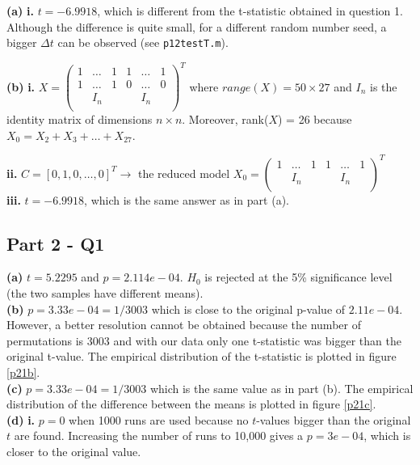 \documentclass[11pt,a4paper,oneside]{report}
\begin{document}
\noindent \large{\textbf{(a)}} \textbf{i. } $t = -6.9918$, which is different from the t-statistic obtained in question 1. Although the difference is quite small, for a different random number seed, a bigger $\Delta t$ can be observed (see \texttt{p12testT.m}). 

\noindent \large{\textbf{(b)}} \textbf{i. } $X = \begin{pmatrix}
1 & \dots & 1 & 1 & \dots & 1\\
1 & \dots & 1 & 0 & \dots & 0\\
& I_n & & & I_n &\\
\end{pmatrix}^T$  where $range(X) = 50 \times 27$ and $I_n$ is the identity matrix of dimensions $n \times n$. Moreover, rank($X$) = 26 because $X_0 = X_2 + X_3 + \dots + X_{27}$.

\textbf{ii. } $C = [0, 1, 0, \dots, 0]^T \to$ the reduced model $X_0 = \begin{pmatrix}
1 & \dots & 1 & 1 & \dots & 1\\
& I_n & & & I_n &\\
\end{pmatrix}^T$\\

\textbf{iii. }  $t = -6.9918$, which is the same answer as in part (a).\\

\subsection*{Part 2 - Q1}

\noindent \large{\textbf{(a)}} $t = 5.2295$ and $p=2.114e-04$. $H_0$ is rejected at the 5\% significance level (the two samples have different means).\\

\noindent \large{\textbf{(b)}} $p=3.33e-04 = 1/3003$ which is close to the original p-value of $2.11e-04$. However, a better resolution cannot be obtained because the number of permutations is 3003 and with our data only one t-statistic was bigger than the original t-value. The empirical distribution of the t-statistic is plotted in figure \ref{p21b}.\\

\noindent \large{\textbf{(c)}} $p=3.33e-04 = 1/3003$ which is the same value as in part (b). The empirical distribution of the difference between the means is plotted in figure \ref{p21c}.\\

\noindent \large{\textbf{(d)}} \textbf{i. } $p = 0$ when 1000 runs are used because no $t$-values bigger than the original $t$ are found. Increasing the number of runs to 10,000 gives a $p= 3e-04$, which is closer to the original value.
\end{document}
